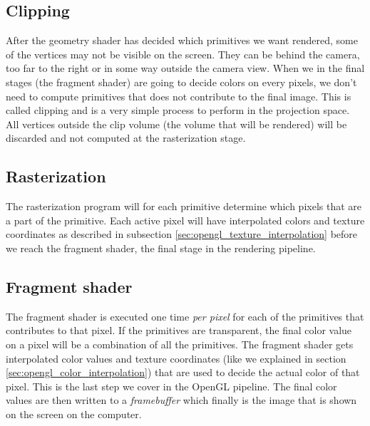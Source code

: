 \subsection{Clipping}
After the geometry shader has decided which primitives we want rendered, some of the vertices may not be visible on the screen. They can be behind the camera, too far to the right or in some way outside the camera view. When we in the final stages (the fragment shader) are going to decide colors on every pixels, we don't need to compute primitives that does not contribute to the final image. This is called clipping and is a very simple process to perform in the projection space. All vertices outside the clip volume (the volume that will be rendered) will be discarded and not computed at the rasterization stage.
\subsection{Rasterization}
The rasterization program will for each primitive determine which pixels that are a part of the primitive. Each active pixel will have interpolated colors and texture coordinates as described in subsection \ref{sec:opengl_texture_interpolation} before we reach the fragment shader, the final stage in the rendering pipeline.
\subsection{Fragment shader}
The fragment shader is executed one time \textit{per pixel} for each of the primitives that contributes to that pixel. If the primitives are transparent, the final color value on a pixel will be a combination of all the primitives. The fragment shader gets interpolated color values and texture coordinates (like we explained in section \ref{sec:opengl_color_interpolation}) that are used to decide the actual color of that pixel. This is the last step we cover in the OpenGL pipeline. The final color values are then written to a \textit{framebuffer} which finally is the image that is shown on the screen on the computer.